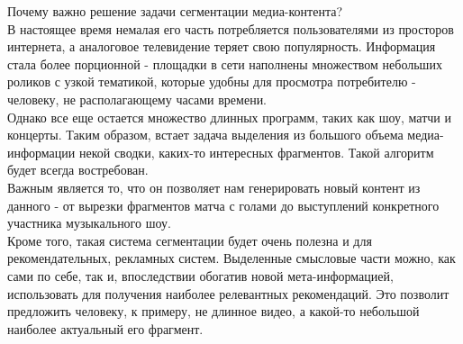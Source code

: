\documentclass[../body.tex]{subfiles}
\begin{document}
	Почему важно решение задачи сегментации медиа-контента?\\ В настоящее время немалая его часть потребляется пользователями из просторов интернета, а аналоговое телевидение теряет свою популярность. Информация стала более порционной - площадки в сети наполнены множеством небольших роликов с узкой тематикой, которые удобны для просмотра потребителю - человеку, не располагающему часами времени.\\
	Однако все еще остается множество длинных программ, таких как шоу, матчи и концерты. Таким образом, встает задача выделения из большого объема медиа-информации некой сводки, каких-то интересных фрагментов. Такой алгоритм будет всегда востребован.\\
	Важным является то, что он позволяет нам генерировать новый контент из данного - от вырезки фрагментов матча с голами до выступлений конкретного участника музыкального шоу.\\
	Кроме того, такая система сегментации будет очень полезна и для рекомендательных, рекламных систем. Выделенные смысловые части можно, как сами по себе, так и, впоследствии обогатив новой мета-информацией, использовать для  получения наиболее релевантных рекомендаций. Это позволит предложить человеку, к примеру, не длинное видео, а какой-то небольшой наиболее актуальный его фрагмент.
	
\end{document}
